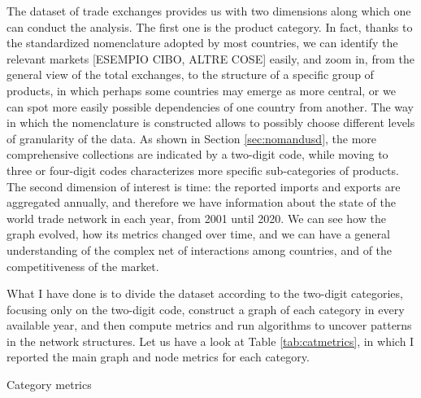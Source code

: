 The dataset of trade exchanges provides us with two dimensions along which one can conduct the analysis. The first one is the product category. In fact, thanks to the standardized nomenclature adopted by most countries, we can identify the relevant markets [ESEMPIO CIBO, ALTRE COSE] easily, and zoom in, from the general view of the total exchanges, to the structure of a specific group of products, in which perhaps some countries may emerge as more central, or we can spot more easily possible dependencies of one country from another. The way in which the nomenclature is constructed allows to possibly choose different levels of granularity of the data. As shown in Section \ref{sec:nomandusd}, the more comprehensive collections are indicated by a two-digit code, while moving to three or four-digit codes characterizes more specific sub-categories of products. 
The second dimension of interest is time: the reported imports and exports are aggregated annually, and therefore we have information about the state of the world trade network in each year, from 2001 until 2020. We can see how the graph evolved, how its metrics changed over time, and we can have a general understanding of the complex net of interactions among countries, and of the competitiveness of the market.

What I have done is to divide the dataset according to the two-digit categories, focusing only on the two-digit code, construct a graph of each category in every available year, and then compute metrics and run algorithms to uncover patterns in the network structures.
Let us have a look at Table \ref{tab:catmetrics}, in which I reported the main graph and node metrics for each category.

\begin{table}
    \resizebox{1\textwidth}{!}{
    
    }
    \caption{Category metrics}
    \label{tab:catmetrics}
\end{table}


